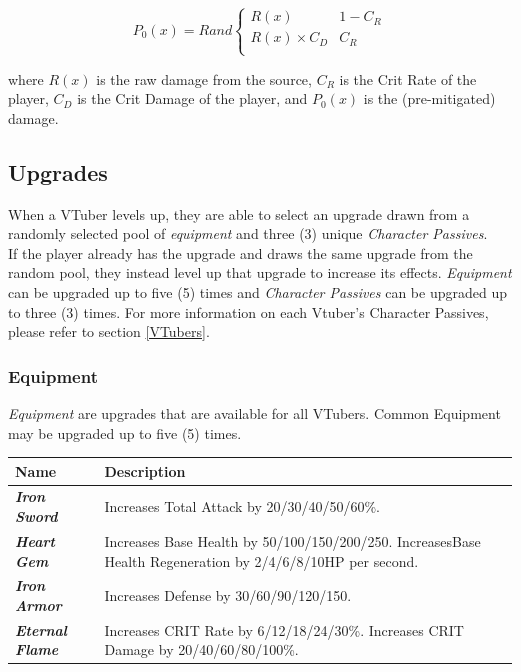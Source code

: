 \documentclass[10pt, a4paper]{article}
\begin{document}
\begin{multicols}{2}
\begin{itemize}
  	 \[
	  	 P_0(x) = Rand\begin{cases}
	  	 	R(x) & 1 - C_R\\
	  	 	R(x) \times C_D & C_R \\
	  	 \end{cases}
  	 \]
  	 
  	 where $R(x)$ is the raw damage from the source, $C_R$ is the Crit Rate of the player, $C_D$ is the Crit Damage of the player, and $P_0(x)$ is the (pre-mitigated) damage.
  	 
  	\end{itemize}
  	
  	\subsection{Upgrades} \label{Upgrades}
  	
  	When a VTuber levels up, they are able to select an upgrade drawn from a randomly selected pool of \textit{equipment} and three (3) unique \textit{Character Passives}. \\
  	
  	If the player already has the upgrade and draws the same upgrade from the random pool, they instead level up that upgrade to increase its effects. \textit{Equipment} can be upgraded up to five (5) times and \textit{Character Passives} can be upgraded up to three (3) times. For more information on each Vtuber's Character Passives, please refer to section \ref{VTubers}.
	
  	\subsubsection{Equipment}
  	
  	\textit{Equipment} are upgrades that are available for all VTubers. Common Equipment may be upgraded up to five (5) times.
  	
  	\begin{center}
		\begin{tabular}{|p{2.7cm}|p{5.5cm}|}
			\hline
			\textbf{Name} & \textbf{Description} \\
			\hline
			\textit{\textbf{Iron Sword}} & Increases Total Attack by 20/30/40/50/60\%. \\
			\textit{\textbf{Heart Gem}} & Increases Base Health by 50/100/150/200/250. IncreasesBase Health Regeneration by 2/4/6/8/10HP per second. \\
			\textit{\textbf{Iron Armor}} & Increases Defense by 30/60/90/120/150. \\
			\textit{\textbf{Eternal Flame}} & Increases CRIT Rate by 6/12/18/24/30\%. Increases CRIT Damage by 20/40/60/80/100\%. \\
			\hline
		\end{tabular}
	\end{center}


\end{multicols}
\end{document}
